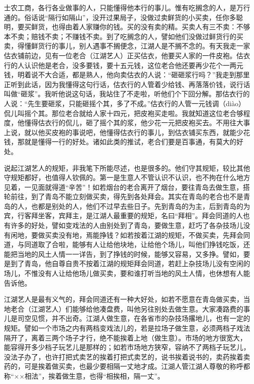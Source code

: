 \documentclass[12pt,UTF8]{ctexbook}
\begin{document}
士农工商，各行各业做事的人，只能懂得他本行的事儿。惟有吃搁念的人，是万行通的。俗话说“隔行如隔山”，没开过果局子，没做过卖鲜货的小买卖，任你多聪明，要买鲜货，也得由着人家赚你的钱。买的没有卖的精。买卖人有三不卖：不够本不卖；赔钱不卖；不赚钱不卖。到了吃搁念的人，譬如他们没做过鲜货行的买卖，得懂鲜货行的事儿，别人遇事不搁便念，江湖人是不搁不念的。有天我走一家估衣铺前边，见有一位老合（江湖艺人）正买估衣，他要买人家的一件皮袍。估衣行的人认识他是老合，没多要钱，要十五元钱，这位老合他还要再少花个一两元钱，明着说不大合适，都是熟人，他向卖估衣的人说：“砸砸浆行吗？”我走到那里正听到此话，因为我懂得这句行话，估衣行的人管着少给钱、再落落价钱，说行话叫做“砸浆”。我听他说这句话，我站住了不走啦，听他们个下回分解。那估衣行的人说：“先生要砸浆，只能砸摇个其，多了不成。”估衣行的人管一元钱调（diào）侃儿叫摇个其。那位老合就给人家十四元，把皮袍买走啦。我就知道这位老合够程度，他懂得估衣行的侃儿，砸了摇个其的浆，他少花一元把皮袍买去。不用往大事上说，就以他买皮袍的事说吧，他懂得估衣行的事儿，到估衣铺买东西，就能少花钱，那就是懂得一行的好处。诸如此类的推试，老合们要是百事通，有莫大的好处。

说起江湖艺人的规矩，非我笔下所能尽述，也是很多的。他们守其规矩，较比其他守规矩都好，也值得人钦佩的。第一是生意人不管认识不认识，也不拘在什么地方见着，一见面就得道“辛苦”！如若烟台的老合离开了烟台，要往青岛去做生意，搭轮前往，到了青岛不能立刻做买卖，得先到各处拜会。其实在青岛的老合也不是青岛的人，也都是别处的人，他们不过早去些日子。先到青岛的为主，后到青岛的为宾，行客拜坐客，宾拜主，是江湖人最重要的规矩，名曰“拜相”。拜会同道的人也有许多的好处，譬如变戏法的人由别处到了青岛，要做生意，赶巧了各杂技场儿没有闲地，要做买卖没有地，焉能挣钱？如若按着江湖的规矩，不做买卖，先拜会同道，与同道取了合啦，能够有人让给他块地，让给他个场儿，叫他们挣钱吃饭，还能把当地的风土人情一一详告，到了挣钱的时候，能够又容易，又多挣。譬如，要是到了青岛，他自尊自贵不按着江湖的规矩拜会同道，若赶上杂技场儿没有空闲的场儿，不惟没有人让给他场儿做买卖，要和谁打听当地的风土人情，也休想有人能告诉他。

江湖艺人是最有义气的，拜会同道还有一种大好处，如若不愿意在青岛做买卖，当地老合（江湖艺人）们能够给他凑盘费，叫他另往别处去做生意。大家凑路费的事儿是司空见惯，并不出奇。江湖人做生意，在各省市的杂技场撂地儿，也有一定的规矩。譬如一个市场之内有两档变戏法儿的，若是拉场子做生意，必须两档子戏法隔开了，离着三两个场子才行，绝不能挨着上地（做生意）。市场的地方很宽大，能容得开多少档子玩艺儿是那样的；如若市场地方狭窄，容纳不了两档子玩艺儿，没法子办了，也许打把式卖艺的挨着打把式卖艺的，说书挨着说书的，卖药挨着卖药的，可是挨着做买卖，也最少要相隔一丈地才成。江湖人管江湖人尊敬的称呼都称“××相法”，挨着做生意，也得“相挨相，隔一丈”。
\end{document}
